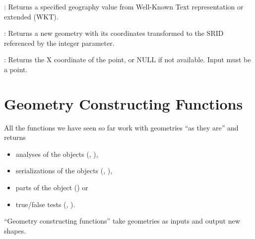 \documentclass[a4paper,11pt,english]{sphinxmanual}
\begin{document}
: Returns a specified geography value from Well-Known Text representation or extended (WKT).

: Returns a new geometry with its coordinates transformed to the SRID referenced by the integer parameter.

: Returns the X coordinate of the point, or NULL if not available. Input must be a point.


\section{Geometry Constructing Functions}
\label{\detokenize{basic:geometry-constructing-functions}}\label{\detokenize{basic:geometry-returning}}
All the functions we have seen so far work with geometries “as they are” and returns
\begin{itemize}
\item {} 
analyses of the objects (, ),

\item {} 
serializations of the objects (, ),

\item {} 
parts of the object () or

\item {} 
true/false tests (, ).

\end{itemize}

“Geometry constructing functions” take geometries as inputs and output new shapes.
\end{document}
